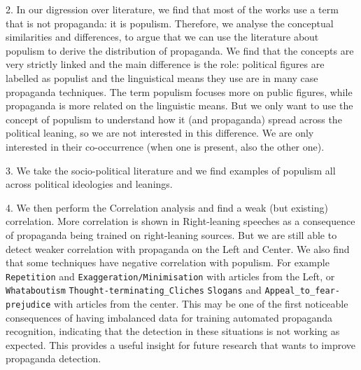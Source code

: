 2. In our digression over literature, we find that most of the works use a term that is not propaganda: it is populism. Therefore, we analyse the conceptual similarities and differences, to argue that we can use the literature about populism to derive the distribution of propaganda.
We find that the concepts are very strictly linked and the main difference is the role: political figures are labelled as populist and the linguistical means they use are in many case propaganda techniques. The term populism focuses more on public figures, while propaganda is more related on the linguistic means.
But we only want to use the concept of populism to understand how it (and propaganda) spread across the political leaning, so we are not interested in this difference. We are only interested in their co-occurrence (when one is present, also the other one).

3. %
We take the socio-political literature and we find examples of populism all across political ideologies and leanings.


4. We then perform the Correlation analysis and find a weak (but existing) correlation.
More correlation is shown in Right-leaning speeches as a consequence of propaganda being trained on right-leaning sources. But we are still able to detect weaker correlation with propaganda on the Left and Center.
We also find that some techniques have negative correlation with populism. For example \texttt{Repetition} and \texttt{Exaggeration/Minimisation} with articles from the Left, or \texttt{Whataboutism} \texttt{Thought-terminating\_Cliches} \texttt{Slogans} and \texttt{Appeal\_to\_fear-prejudice} with articles from the center.
This may be one of the first noticeable consequences of having imbalanced data for training automated propaganda recognition, indicating that the detection in these situations is not working as expected.
This provides a useful insight for future research that wants to improve propaganda detection.
